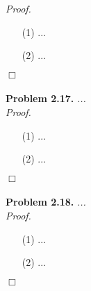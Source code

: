 \documentclass{article}
\begin{document}
\emph{Proof.}
\begin{enumerate}
\item[(1)]
  ...

\item[(2)]
  ...
\end{enumerate}
$\Box$ \\\\






\textbf{Problem 2.17.}
\emph{...} \\



\emph{Proof.}
\begin{enumerate}
\item[(1)]
  ...

\item[(2)]
  ...
\end{enumerate}
$\Box$ \\\\






\textbf{Problem 2.18.}
\emph{...} \\



\emph{Proof.}
\begin{enumerate}
\item[(1)]
  ...

\item[(2)]
  ...
\end{enumerate}
$\Box$ \\\\



\end{document}
